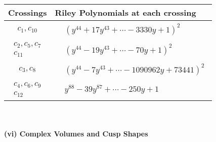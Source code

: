 \documentclass[1p]{elsarticle_modified}
\theoremstyle{definition}
\begin{document}
\begin{tabular}{m{50pt}|m{274pt}}
Crossings & \hspace{64pt}Riley Polynomials at each crossing \\
\hline $$\begin{aligned}c_{1},c_{10}\end{aligned}$$&$\begin{aligned}
&(y^{44}+17 y^{43}+\cdots-3330 y+1)^{2}
\end{aligned}$\\
\hline $$\begin{aligned}c_{2},c_{5},c_{7}\\c_{11}\end{aligned}$$&$\begin{aligned}
&(y^{44}-19 y^{43}+\cdots-70 y+1)^{2}
\end{aligned}$\\
\hline $$\begin{aligned}c_{3},c_{8}\end{aligned}$$&$\begin{aligned}
&(y^{44}-7 y^{43}+\cdots-1090962 y+73441)^{2}
\end{aligned}$\\
\hline $$\begin{aligned}c_{4},c_{6},c_{9}\\c_{12}\end{aligned}$$&$\begin{aligned}
&y^{88}-39 y^{87}+\cdots-250 y+1
\end{aligned}$\\
\hline
\end{tabular}\\~\\
\newpage\flushleft \textbf{(vi) Complex Volumes and Cusp Shapes}
\end{document}
